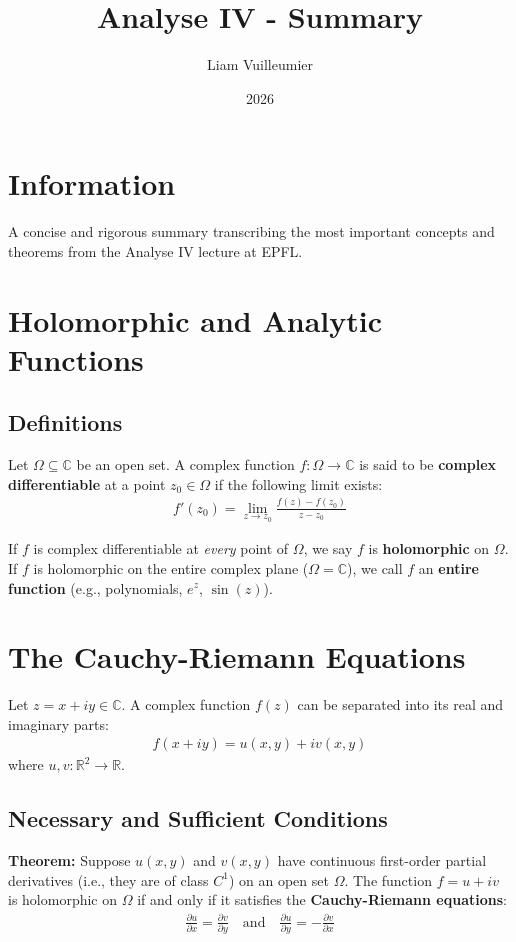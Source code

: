 \documentclass[a4paper,11pt]{article}
\title{\textbf{Analyse IV - Summary}}
\author{Liam Vuilleumier}
\date{2026}
\begin{document}
\maketitle

\section{Information}
A concise and rigorous summary transcribing the most important concepts and theorems from the Analyse IV lecture at EPFL.

\section{Holomorphic and Analytic Functions}
\subsection{Definitions}
Let $\Omega \subseteq \mathbb{C}$ be an open set. A complex function $f: \Omega \to \mathbb{C}$ is said to be \textbf{complex differentiable} at a point $z_0 \in \Omega$ if the following limit exists:
\begin{align*}
    f'(z_0) = \lim_{z \to z_0} \frac{f(z) - f(z_0)}{z - z_0}
\end{align*}

If $f$ is complex differentiable at \textit{every} point of $\Omega$, we say $f$ is \textbf{holomorphic} on $\Omega$. 
\\ If $f$ is holomorphic on the entire complex plane ($\Omega = \mathbb{C}$), we call $f$ an \textbf{entire function} (e.g., polynomials, $e^z$, $\sin(z)$).

\section{The Cauchy-Riemann Equations}
Let $z = x + iy \in \mathbb{C}$. A complex function $f(z)$ can be separated into its real and imaginary parts:
\begin{align*}
    f(x+iy) = u(x,y) + i v(x,y)
\end{align*}
where $u, v : \mathbb{R}^2 \to \mathbb{R}$.

\subsection{Necessary and Sufficient Conditions}
\textbf{Theorem:} Suppose $u(x,y)$ and $v(x,y)$ have continuous first-order partial derivatives (i.e., they are of class $C^1$) on an open set $\Omega$. The function $f = u + iv$ is holomorphic on $\Omega$ if and only if it satisfies the \textbf{Cauchy-Riemann equations}:
\begin{align*}
    \frac{\partial u}{\partial x} = \frac{\partial v}{\partial y} \quad \text{and} \quad \frac{\partial u}{\partial y} = -\frac{\partial v}{\partial x}
\end{align*}
\end{document}
